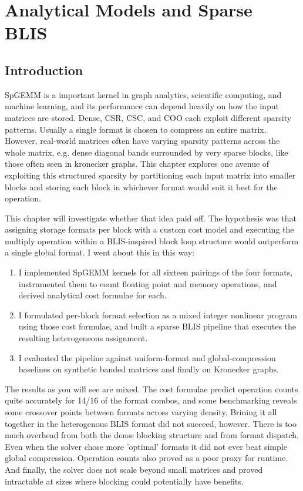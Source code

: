 \chapter{Analytical Models and Sparse BLIS}
\label{ch:pact}

\section{Introduction}
SpGEMM is a important kernel in graph analytics, scientific computing, and machine learning, and its performance
can depend heavily on how the input matrices are stored. Dense, CSR, CSC, and COO each exploit different sparsity patterns. Usually a single format is chosen
to compress an entire matrix. However, real-world matrices often have varying sparsity patterns across the whole matrix, e.g. dense diagonal bands
surrounded by very sparse blocks, like those often seen in kronecker graphs. This chapter explores one avenue of exploiting this structured sparsity by
partitioning each input matrix into smaller blocks and storing each block in whichever format would suit it best for the operation.

This chapter will investigate whether that idea paid off. The hypothesis was that assigning storage formats per block with a custom cost model and executing the
multiply operation within a BLIS-inspired block loop structure would outperform a single global format. I went about this in this way:

\begin{enumerate}
  \item I implemented SpGEMM kernels for all sixteen pairings of the four
        formats, instrumented them to count floating point and memory
        operations, and derived analytical cost formulae for each.
  \item I formulated per-block format selection as a mixed integer nonlinear
        program using those cost formulae, and built a sparse BLIS pipeline
        that executes the resulting heterogeneous assignment.
  \item I evaluated the pipeline against uniform-format and global-compression
        baselines on synthetic banded matrices and finally on Kronecker graphs.
\end{enumerate}

The results as you will see are mixed. The cost formulae predict operation counts quite accurately for 14/16 of the format combos, and some benchmarking reveals
some crossover points between formats across varying density. Brining it all together in the heterogenous BLIS format did not succeed, however. There is too much
overhead from both the dense blocking structure and from format dispatch. Even when the solver chose more 'optimal' formats it did not ever beat
simple global compression. Operation counts also proved as a poor proxy for runtime. And finally, the solver does not scale beyond small matrices and
proved intractable at sizes where blocking could potentially have benefits.

